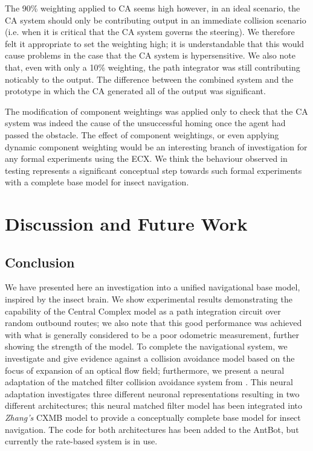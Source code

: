 \documentclass[a4paper,11pt,twoside,openright]{article}
\let\oldsection\section
\def\section{\cleardoublepage\oldsection}
\begin{document}
The 90\% weighting applied to CA seems high however, in an ideal
scenario, the CA system should only be contributing output in an
immediate collision scenario (i.e. when it is critical that the CA
system governs the steering). We therefore felt it appropriate to set
the weighting high; it is understandable that this would cause
problems in the case that the CA system is hypersensitive. We also
note that, even with only a 10\% weighting, the path integrator was still
contributing noticably to the output. The difference between the
combined system and the prototype in which the CA generated all of the
output was significant.
\newline\par

The modification of component weightings was applied only to check
that the CA system was indeed the cause of the unsuccessful homing
once the agent had passed the obstacle. The effect of component
weightings, or even applying dynamic component weighting would be an
interesting branch of investigation for any formal experiments using
the ECX. We think the behaviour observed in testing represents a
significant conceptual step towards such formal experiments with a
complete base model for insect navigation.
\newpage


\section{ Discussion and Future Work}
\subsection{Conclusion}
We have presented here an investigation into a unified navigational
base model, inspired by the insect brain. We show experimental results
demonstrating the capability of the Central Complex model as a path
integration circuit over random outbound routes; we also note that
this good performance was achieved with what is generally considered
to be a poor odometric measurement, further showing the strength of
the model. To complete the navigational system, we investigate and
give evidence against a collision avoidance model based on the focus
of expansion of an optical flow field; furthermore, we present a
neural adaptation of the matched filter collision avoidance system
from \cite{Mitchell2018}. This neural adaptation investigates three
different neuronal representations resulting in two different
architectures; this neural matched filter model has been integrated
into \textit{Zhang's} CXMB model to provide a conceptually complete
base model for insect navigation. The code for both architectures
has been added to the AntBot, but currently the rate-based system is
in use.\newline\par
\end{document}
